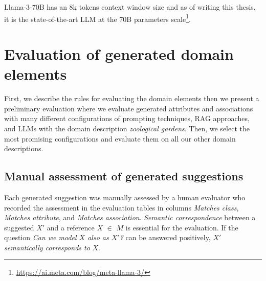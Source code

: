 Llama-3-70B has an 8k tokens context window size and as of writing this thesis, it is the state-of-the-art LLM at the 70B parameters scale\footnote{\url{https://ai.meta.com/blog/meta-llama-3/}}.


%


\section{Evaluation of generated domain elements}

First, we describe the rules for evaluating the domain elements then we present a preliminary evaluation where we evaluate generated attributes and associations with many different configurations of prompting techniques, RAG approaches, and LLMs with the domain description \textit{zoological gardens}. Then, we select the most promising configurations and evaluate them on all our other domain descriptions.


\subsection{Manual assessment of generated suggestions}

Each generated suggestion was manually assessed by a human evaluator who recorded the assessment in the evaluation tables in columns \emph{Matches class}, \emph{Matches attribute}, and \emph{Matches association}.
\emph{Semantic correspondence} between a suggested $X'$ and a reference $X$ $\in$ $M$ is essential for the evaluation.
If the question \emph{Can we model $X$ also as $X'$?} can be answered positively, $X'$ \emph{semantically corresponds to} $X$.

